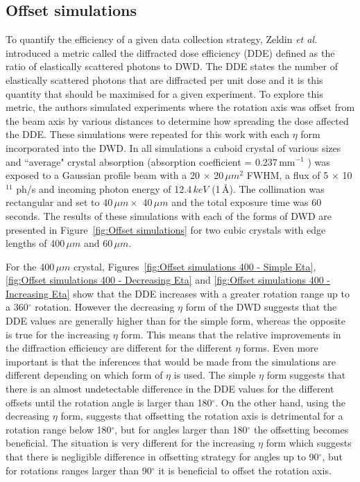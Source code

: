 \subsection{Offset simulations}
\label{sub:Offset Simulations}
To quantify the efficiency of a given data collection strategy, Zeldin \textit{et al.} introduced a metric called the diffracted dose efficiency (DDE) defined as the ratio of elastically scattered photons to DWD.
The DDE states the number of elastically scattered photons that are diffracted per unit dose and it is this quantity that should be maximised for a given experiment.
To explore this metric, the authors simulated experiments where the rotation axis was offset from the beam axis by various distances to determine how spreading the dose affected the DDE.
These simulations were repeated for this work with each $\eta$ form incorporated into the DWD.
In all simulations a cuboid crystal of various sizes and ``average" crystal absorption (absorption coefficient = 0.237$\,$mm$^{-1}$ \cite{zeldin2013}) was exposed to a Gaussian profile beam with a 20 $\times$ 20$\,\mu m^2$ FWHM, a flux of 5 $\times$ 10$^{11}$ ph/s and incoming photon energy of 12.4$\,keV$ (1$\,$\AA).
The collimation was rectangular and set to 40$\,\mu m \times$ 40$\,\mu m$ and the total exposure time was 60 seconds.
The results of these simulations with each of the forms of DWD are presented in Figure~\ref{fig:Offset simulations} for two cubic crystals with edge lengths of 400$\,\mu m$ and 60$\,\mu m$.

For the 400$\,\mu m$ crystal, Figures~\ref{fig:Offset simulations 400 - Simple Eta}, \ref{fig:Offset simulations 400 - Decreasing Eta} and \ref{fig:Offset simulations 400 - Increasing Eta} show that the DDE increases with a greater rotation range up to a 360$^{\circ}$ rotation.
However the decreasing $\eta$ form of the DWD suggests that the DDE values are generally higher than for the simple form, whereas the opposite is true for the increasing $\eta$ form.
This means that the relative improvements in the diffraction efficiency are different for the different $\eta$ forms.
Even more important is that the inferences that would be made from the simulations are different depending on which form of $\eta$ is used.
The simple $\eta$ form suggests that there is an almost undetectable difference in the DDE values for the different offsets until the rotation angle is larger than 180$^{\circ}$.
On the other hand, using the decreasing $\eta$ form, suggests that offsetting the rotation axis is detrimental for a rotation range below 180$^{\circ}$, but for angles larger than 180$^{\circ}$ the offsetting becomes beneficial.
The situation is very different for the increasing $\eta$ form which suggests that there is negligible difference in offsetting strategy for angles up to 90$^{\circ}$, but for rotations ranges larger than 90$^{\circ}$ it is beneficial to offset the rotation axis.

